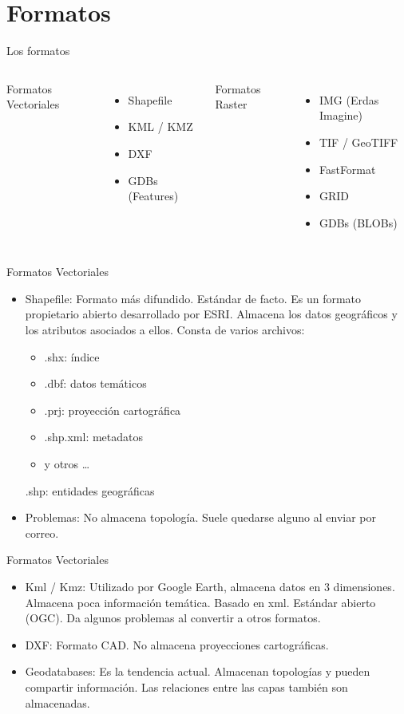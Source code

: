 \documentclass{beamer}
\begin{document}
\section{Formatos}

\begin{frame}{Los formatos}
	\begin{columns}[t]
			Formatos Vectoriales
			\begin{itemize}
				\item Shapefile 
				\item KML / KMZ 
				\item DXF
				\item GDBs (Features)
			\end{itemize}
			Formatos Raster
			\begin{itemize}
				\item IMG (Erdas Imagine)
				\item TIF / GeoTIFF
				\item FastFormat
				\item GRID
				\item GDBs (BLOBs)
			\end{itemize}
	\end{columns}
\end{frame}

\begin{frame}{Formatos Vectoriales}
	\begin{itemize}[<+->]
		\item Shapefile: Formato más difundido. Estándar de facto. Es un formato propietario abierto desarrollado por ESRI. Almacena los datos geográficos y los atributos asociados a ellos. Consta de varios archivos:
		\begin{itemize}
			\item .shx: índice
			\item .dbf: datos temáticos
			\item .prj: proyección cartográfica
			\item .shp.xml: metadatos
			\item y otros \ldots
		\end{itemize}.shp: entidades geográficas
		\item Problemas: No almacena topología. Suele quedarse alguno al enviar por correo.
	\end{itemize}
\end{frame}

\begin{frame}{Formatos Vectoriales}
	\begin{itemize}[<+->]
		\item Kml / Kmz: Utilizado por Google Earth, almacena datos en 3 dimensiones. Almacena poca información temática. Basado en xml. Estándar abierto (OGC). Da algunos problemas al convertir a otros formatos.
		\item DXF: Formato CAD. No almacena proyecciones cartográficas.
		\item Geodatabases: Es la tendencia actual. Almacenan topologías y pueden compartir información. Las relaciones entre las capas también son almacenadas.
	\end{itemize}
\end{frame}
\end{document}
